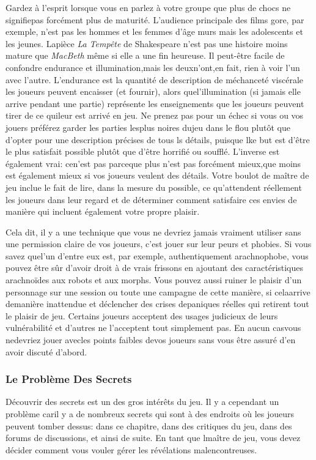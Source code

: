 Gardez à l'esprit lorsque vous en parlez à votre groupe que plus de chocs ne signifiepas forcément plus de maturité. L'audience principale des films gore, par exemple, n'est  pas les hommes et les femmes d'âge murs mais les adolescents et les jeunes. Lapièce \textit{La Tempête} de Shakespeare n'est pas une histoire moins mature que \textit{MacBeth} même si elle a une fin heureuse. Il peut-être facile de confondre endurance et illumination,mais les deuxn'ont,en fait, rien à voir l'un avec l'autre. L'endurance est la quantité de description de méchanceté viscérale les joueurs peuvent encaisser (et fournir), alors quel'illumination (si jamais elle arrive pendant une partie) représente les enseignements que les joueurs peuvent tirer de ce quileur est arrivé en jeu. Ne prenez pas pour un échec si vous ou vos jouers préférez garder les parties lesplus noires dujeu dans le flou plutôt que d'opter pour une description précises de tous ls détails, puisque lke but est d'être le plus satisfait possible plutôt que d'être horrifié ou soufflé. L'inverse est également vrai: cen'est pas parceque plus n'est pas forcément mieux,que moins est également mieux si vos joueurs veulent des détails. Votre boulot de maître de jeu inclue le fait de lire, dans la mesure du possible, ce qu'attendent réellement les joueurs dans leur regard et de déterminer comment satisfaire ces envies de manière qui incluent également votre propre plaisir. 

Cela dit, il y a une technique que vous ne devriez jamais vraiment utiliser sans une permission claire de vos joueurs, c'est jouer sur leur peurs et phobies. Si vous savez quel'un d'entre eux est, par exemple, authentiquement arachnophobe, vous pouvez être sûr d'avoir droit à de vrais frissons en ajoutant des caractéristiques arachnoïdes aux robots et aux morphs. Vous pouvez aussi ruiner le plaisir d'un personnage sur une session ou toute une campagne de cette manière, si celaarrive demanière inattendue et déclencher des crises depaniques réelles qui retirent tout le plaisir de jeu. Certains joueurs acceptent des usages judicieux de leurs vulnérabilité et d'autres ne l'acceptent tout simplement pas. En aucun casvous nedevriez jouer avecles points faibles devos joueurs sans vous être assuré d'en avoir discuté d'abord. 

\subsubsection{Le Problème Des Secrets} 

Découvrir des secrets est un des gros intérêts du jeu. Il y a cependant un problème caril y a de nombreux secrets qui sont à des endroits où les joueurs peuvent tomber dessus: dans ce chapitre, dans des critiques du jeu, dans des forums de discussions, et ainsi de suite. En tant que lmaître de jeu, vous devez décider comment vous vouler gérer les révélations malencontreuses. 


